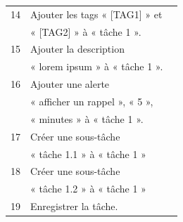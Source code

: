 \documentclass[letterpaper, oneside, 12pt, these, creativecommons]{thETS}
\begin{document}
\begin{table}
\begin{tabular}{|l|l|l|}
		14		& Ajouter les tags « [TAG1] » et 	&							\\
				& « [TAG2] » à « tâche 1 ».	&							\\ \hline
		15		& Ajouter la description 		&							\\
				& « lorem ipsum » à « tâche 1 ».	&							\\ \hline
		16		& Ajouter une alerte 	 	&							\\
				& « afficher un rappel », « 5 »,	& 							\\
				&  « minutes » à « tâche 1 ».	&							\\ \hline
		17		& Créer une sous-tâche		&							\\
				&  « tâche 1.1 » à « tâche 1 »	&							\\ \hline
		18		& Créer une sous-tâche		&							\\
				&  « tâche 1.2 » à « tâche 1 »	&							\\ \hline
		19		& Enregistrer la tâche.		& 							\\ \hline
	\end{tabular}
\end{table}

\newpage
\end{document}
